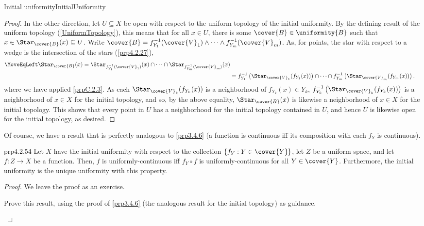 \begin{prp}{Initial uniformity}{InitialUniformity}
\begin{proof}
In the other direction, let $U\subseteq X$ be open with respect to the uniform topology of the initial uniformity.  By the defining result of the uniform topology (\cref{UniformTopology}), this means that for all $x\in U$, there is some $\cover{B}\in \uniformity{B}$ such that $x\in \Star _{\cover{B}}(x)\subseteq U$.  Write $\cover{B}=f_{Y_1}^{-1}(\cover{V}_1)\wedge \cdots \wedge f_{Y_m}^{-1}(\cover{V}_m)$.  As, for points, the star with respect to a wedge is the intersection of the stars (\cref{prp4.2.27}),
{\small
\begin{equation}
\begin{split}
\MoveEqLeft
\Star _{\cover{B}}(x)=\Star _{f_{Y_1}^{-1}(\cover{V}_1)}(x)\cap \cdots \cap \Star _{f_{Y_m}^{-1}(\cover{V}_m)}(x) \\
& =f_{Y_1}^{-1}\left( \Star _{\cover{V}_1}(f_{Y_1}(x))\right) \cap \cdots \cap f_{Y_m}^{-1}\left( \Star _{\cover{V}_m}(f_{Y_m}(x))\right) .
\end{split}
\end{equation}
}
where we have applied \cref{prpC.2.3}.  As each $\Star _{\cover{V}_k}(f_{Y_k}(x))$ is a neighborhood of $f_{Y_k}(x)\in Y_k$, $f_{Y_k}^{-1}\left( \Star _{\cover{V}_k}(f_{Y_k}(x))\right)$ is a neighborhood of $x\in X$ for the initial topology, and so, by the above equality, $\Star _{\cover{B}}(x)$ is likewise a neighborhood of $x\in X$ for the initial topology.  This shows that every point in $U$ has a neighborhood for the initial topology contained in $U$, and hence $U$ is likewise open for the initial topology, as desired.
\end{proof}
\end{prp}
Of course, we have a result that is perfectly analogous to \cref{prp3.4.6} (a function is continuous iff its composition with each $f_Y$ is continuous).
\begin{prp}{}{prp4.2.54}
Let $X$ have the initial uniformity with respect to the collection $\{ f_Y:Y\in \cover{Y}\}$, let $Z$ be a uniform space, and let $f\colon Z\rightarrow X$ be a function.  Then, $f$ is uniformly-continuous iff $f_Y\circ f$ is uniformly-continuous for all $Y\in \cover{Y}$.  Furthermore, the initial uniformity is the unique uniformity with this property.
\begin{proof}
We leave the proof as an exercise.
\begin{exr}{}{}
Prove this result, using the proof of \cref{prp3.4.6} (the analogous result for the initial topology) as guidance.
\end{exr}
\end{proof}
\end{prp}
